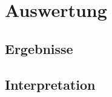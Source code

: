 \chapter{Auswertung}
\label{chap:auswertung}
\section{Ergebnisse}
\label{sec:ergebnisse}
\section{Interpretation}
\label{sec:interpretation}